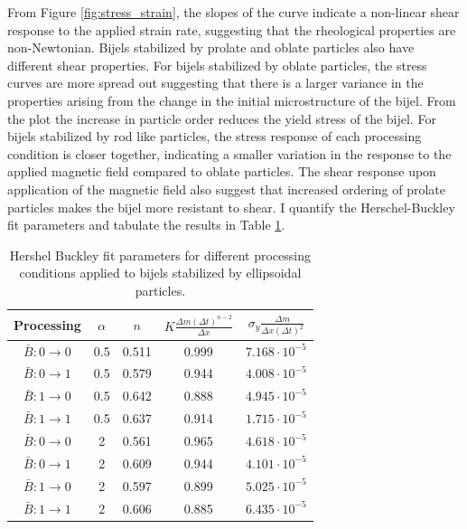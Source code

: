 From Figure \ref{fig:stress_strain}, the slopes of the curve indicate a non-linear shear response to the applied strain rate, suggesting that the rheological properties
are non-Newtonian. Bijels stabilized by prolate and oblate particles also have different shear properties. For bijels stabilized by oblate particles, the stress curves
are more spread out suggesting that there is a larger variance in the properties arising from the change in the initial microstructure of the bijel. From the plot
the increase in particle order reduces the yield stress of the bijel. For bijels stabilized by rod like particles, the stress response of each processing 
condition is closer together, indicating a smaller variation in the response to the applied magnetic field compared to oblate particles. The shear response upon application
of the magnetic field also suggest that increased ordering of prolate particles makes the bijel more resistant to shear. I quantify the Herschel-Buckley fit parameters and 
tabulate the results in Table \ref{table:rheology_fit}.

\begin{table}[h!]
    \centering
    \begin{tabular}{||c c c c c||} 
     \hline
     Processing & $\alpha$ & $n$ & $K \frac{\Delta m (\Delta t)^{n-2}}{\Delta x} $ & $\sigma_{y} \frac{\Delta m}{\Delta x (\Delta t)^2}$ \\ [0.5ex] 
     \hline\hline
     $\bar{B}: 0 \rightarrow 0$ & 0.5 & 0.511 & 0.999 & $7.168 \cdot 10^{-5}$ \\ 
     \hline
     $\bar{B}: 0 \rightarrow 1$ & 0.5 & 0.579 & 0.944 & $4.008 \cdot 10^{-5}$ \\
     \hline
     $\bar{B}: 1 \rightarrow 0$ & 0.5 & 0.642 & 0.888 & $4.945 \cdot 10^{-5}$ \\
     \hline
     $\bar{B}: 1 \rightarrow 1$ & 0.5 & 0.637 & 0.914 & $1.715 \cdot 10^{-5}$ \\
     \hline
     $\bar{B}: 0 \rightarrow 0$ & 2 & 0.561 & 0.965 & $4.618 \cdot 10^{-5}$ \\
     \hline
     $\bar{B}: 0 \rightarrow 1$ & 2 & 0.609 & 0.944 & $4.101 \cdot 10^{-5}$ \\
     \hline
     $\bar{B}: 1 \rightarrow 0$ & 2 & 0.597 & 0.899 & $5.025 \cdot 10^{-5}$ \\
     \hline
     $\bar{B}: 1 \rightarrow 1$ & 2 & 0.606 & 0.885 & $6.435 \cdot 10^{-5}$ \\ [1ex] 
     \hline
    \end{tabular}
    \caption{Hershel Buckley fit parameters for different processing conditions applied to bijels stabilized by ellipsoidal particles.}
    \label{table:rheology_fit}
\end{table}
 
